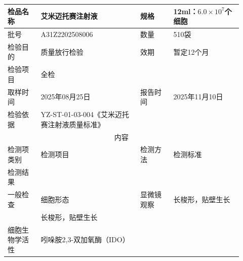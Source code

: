 \documentclass[UTF8,10pt,a4paper,fontset=fandol]{ctexart}
\newcommand{\fieldvalue}[1]{#1}
\begin{document}
\begin{tabular}{|p{0.13\linewidth}|p{0.39\linewidth}|p{0.13\linewidth}|p{0.27\linewidth}|}
\hline
检品名称 &
\fieldvalue{艾米迈托赛注射液} &
规格 &
\fieldvalue{12ml：$6.0\times10^{7}$个细胞}
\\ \hline
批号 &
\fieldvalue{A31Z2202508006} &
数量 &
\fieldvalue{510袋}
\\ \hline
检验目的 &
\fieldvalue{质量放行检验} &
效期 &
\fieldvalue{暂定12个月}
\\ \hline
检验项目 &
\fieldvalue{全检} &
\multicolumn{2}{l|}{}
\\ \hline
取样时间 &
\fieldvalue{2025年08月25日} &
报告时间 &
\fieldvalue{2025年11月10日}
\\ \hline
检验依据 &
\fieldvalue{YZ-ST-01-03-004《艾米迈托赛注射液质量标准》} &
\multicolumn{2}{l|}{}
\\ \hline
\multicolumn{4}{c|}{内容}
\\ \hline
\multicolumn{1}{|p{0.14\linewidth}|}{检测项类别} &
\multicolumn{1}{p{0.20\linewidth}|}{检测项目} &
\multicolumn{1}{p{0.21\linewidth}|}{检测方法} &
\multicolumn{1}{p{0.21\linewidth}|}{检测标准} \\
\hline
\multicolumn{1}{|p{0.14\linewidth}|}{检测结果}
& & &
\\ \hline
\fieldvalue{一般检查} &
\fieldvalue{细胞形态} &
\fieldvalue{显微镜观察} &
\fieldvalue{长梭形，贴壁生长} \\
\hline
\multicolumn{1}{|p{0.14\linewidth}|}{}
&
\fieldvalue{长梭形，贴壁生长}
& &
\\ \hline
\fieldvalue{细胞生物学活性} &
\fieldvalue{吲哚胺2,3-双加氧酶（IDO）} &

\end{tabular}
\end{document}

